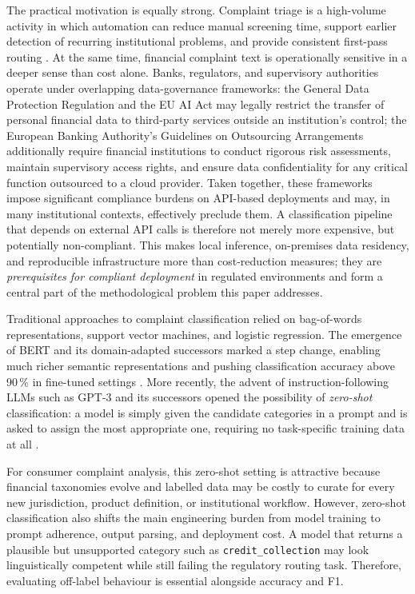 \documentclass[a4paper,fleqn]{cas-dc}
\begin{document}
The practical motivation is equally strong. Complaint triage is a
high-volume activity in which automation can reduce manual screening
time, support earlier detection of recurring institutional problems,
and provide consistent first-pass routing \cite{di2023complaint}.
At the same time, financial complaint text is operationally sensitive
in a deeper sense than cost alone. Banks, regulators, and supervisory
authorities operate under overlapping data-governance frameworks:
the General Data Protection Regulation \cite{gdpr2016} and the EU AI
Act \cite{euaiact2024} may legally restrict the transfer of personal
financial data to third-party services outside an institution's control;
the European Banking Authority's Guidelines on Outsourcing Arrangements
\cite{eba2019outsourcing} additionally require financial institutions to
conduct rigorous risk assessments, maintain supervisory access rights, and
ensure data confidentiality for any critical function outsourced to a cloud
provider. Taken together, these frameworks impose significant compliance
burdens on API-based deployments and may, in many institutional contexts,
effectively preclude them. A classification pipeline that depends on
external API calls is therefore not merely more expensive, but potentially
non-compliant. This makes local inference, on-premises data residency, and
reproducible infrastructure more than cost-reduction measures; they are
\emph{prerequisites for compliant deployment} in regulated environments
and form a central part of the methodological problem this paper addresses.

Traditional approaches to complaint classification relied on
bag-of-words representations, support vector machines, and logistic
regression. The emergence of BERT \cite{devlin2019bert} and its
domain-adapted successors marked a step change, enabling much richer
semantic representations and pushing classification accuracy above
90\,\% in fine-tuned settings \cite{vairetti2024bert}. More recently,
the advent of instruction-following LLMs such as GPT-3 \cite{brown2020gpt3}
and its successors opened the possibility of \emph{zero-shot}
classification: a model is simply given the candidate categories in
a prompt and is asked to assign the most appropriate one, requiring
no task-specific training data at all
\cite{kojima2022zeroshotcot,madanchian2024genai}.

For consumer complaint analysis, this zero-shot setting is attractive
because financial taxonomies evolve and labelled data may be costly to
curate for every new jurisdiction, product definition, or institutional
workflow. However, zero-shot classification also shifts the main
engineering burden from model training to prompt adherence, output
parsing, and deployment cost. A model that returns a plausible but
unsupported category such as \texttt{credit\_collection} may look
linguistically competent while still failing the regulatory routing
task. Therefore, evaluating off-label behaviour is essential alongside
accuracy and F1.
\end{document}
